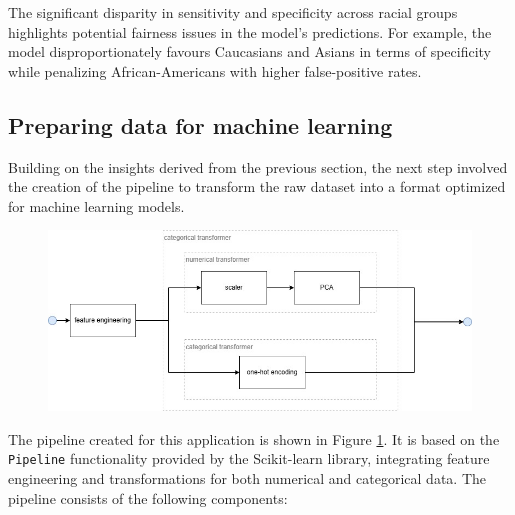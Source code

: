 The significant disparity in sensitivity and specificity across racial groups highlights potential fairness issues in the model's predictions. For example, the model disproportionately favours Caucasians and Asians in terms of specificity while penalizing African-Americans with higher false-positive rates.






\subsection{Preparing data for machine learning}

	Building on the insights derived from the previous section, the next step involved the creation of the pipeline to transform the raw dataset into a format optimized for machine learning models.
	
	\begin{figure}[H]
		\centering
		\includegraphics[width=0.7\linewidth]{img/pipeline}
		\caption{}
		\label{fig:pipeline}
	\end{figure}
	
	The pipeline created for this application is shown in Figure \ref{fig:pipeline}. It is based on the \texttt{Pipeline} functionality provided by the Scikit-learn library, integrating feature engineering and transformations for both numerical and categorical data. The pipeline consists of the following components:

